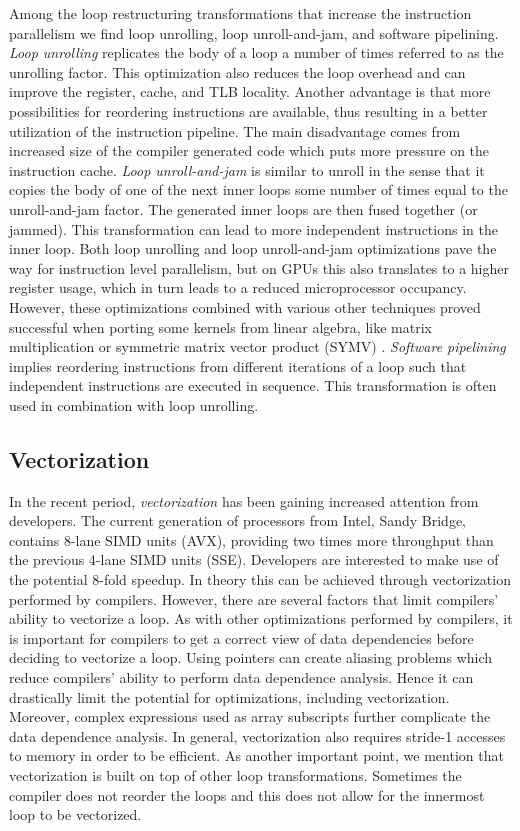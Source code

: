 Among the loop restructuring transformations that increase the instruction
parallelism we find loop unrolling, loop unroll-and-jam, and software
pipelining. \textit{Loop unrolling} replicates the body of a loop a number of
times referred to as the unrolling factor. This optimization also reduces the loop
overhead and can improve the register, cache, and TLB locality. Another
advantage is that more possibilities for reordering instructions are available,
thus resulting in a better utilization of the instruction pipeline. The main
disadvantage comes from increased size of the compiler generated code which puts
more pressure on the instruction cache. \textit{Loop unroll-and-jam} is similar
to unroll in the sense that it copies the body of one of the next inner loops some number
of times equal to the unroll-and-jam factor. The generated inner loops are then
fused together (or jammed). This transformation can lead to more independent
instructions in the inner loop. Both loop unrolling and loop unroll-and-jam
optimizations pave the way for instruction level parallelism, but on GPUs this
also translates to a higher register usage, which in turn leads to a reduced
microprocessor occupancy. However, these optimizations combined with various
other techniques proved successful when porting some kernels from linear
algebra, like matrix multiplication \cite{Volkov:2008:BGT:1413370.1413402} or
symmetric matrix vector product (SYMV) \cite{Nath:2011:OSD:2063384.2063392}.
\textit{Software pipelining} implies reordering instructions from different
iterations of a loop such that independent instructions are executed in
sequence. This transformation is often used in combination with loop unrolling.

\subsection{Vectorization}

In the recent period, \textit{vectorization} has been gaining increased
attention from developers. The current generation of processors from Intel,
Sandy Bridge, contains 8-lane SIMD units (AVX), providing two times more
throughput than the previous 4-lane SIMD units (SSE). Developers are interested
to make use of the potential 8-fold speedup. In theory this can be achieved
through vectorization performed by compilers. However, there are several factors
that limit compilers' ability to vectorize a loop. As with other optimizations
performed by compilers, it is important for compilers to get a correct view of
data dependencies before deciding to vectorize a loop. Using pointers can create
aliasing problems which reduce compilers' ability to perform data dependence
analysis. Hence it can drastically limit the potential for optimizations,
including vectorization. Moreover, complex expressions used as array subscripts
further complicate the data dependence analysis. In general, vectorization also
requires stride-1 accesses to memory in order to be efficient. As another
important point, we mention that vectorization is built on top of other loop
transformations. Sometimes the compiler does not reorder the loops and this does
not allow for the innermost loop to be vectorized.

